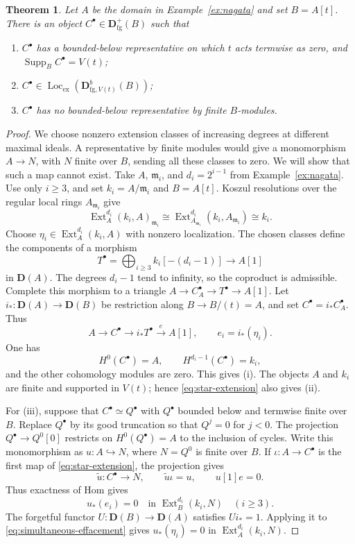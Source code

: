 \documentclass[11pt]{amsart}
\numberwithin{equation}{section}
\newtheorem{theorem}{Theorem}[section]
\theoremstyle{definition}
\theoremstyle{remark}
\DeclareMathOperator{\Supp}{Supp}
\DeclareMathOperator{\Loc}{Loc}
\DeclareMathOperator{\Ext}{Ext}
\newcommand{\D}{\mathbf D}
\newcommand{\fg}{\mathrm{fg}}
\newcommand{\Lex}{\Loc_{\mathrm{ex}}}
\newcommand{\m}{\mathfrak m}
\begin{document}
\begin{theorem}
\label{thm:no-finite-model}
Let $A$ be the domain in Example~\ref{ex:nagata} and set $B=A[t]$.
There is an object $C^{\bullet}\in\D^+_{\fg}(B)$ such that
\begin{enumerate}[label=(\roman*),leftmargin=*]
\item $C^{\bullet}$ has a bounded-below representative on which $t$ acts termwise
as zero, and $\Supp_BC^{\bullet}=V(t)$;
\item $C^{\bullet}\in\Lex(\D^b_{\fg,V(t)}(B))$;
\item $C^{\bullet}$ has no bounded-below representative by finite $B$-modules.
\end{enumerate}
\end{theorem}
\begin{proof}
We choose nonzero extension classes of increasing degrees at different
maximal ideals. A representative by finite modules would give a monomorphism
$A\to N$, with $N$ finite over $B$, sending all these classes to zero.
We will show that such a map cannot exist.
Take $A$, $\m_i$, and $d_i=2^{i-1}$ from Example~\ref{ex:nagata}.
Use only $i\geq3$, and set $k_i=A/\m_i$ and $B=A[t]$.
Koszul resolutions over the regular local rings $A_{\m_i}$ give
\[
 \Ext_A^{d_i}(k_i,A)_{\m_i}
 \cong\Ext_{A_{\m_i}}^{d_i}(k_i,A_{\m_i})\cong k_i.
\]
Choose $\eta_i\in\Ext_A^{d_i}(k_i,A)$ with nonzero localization.
The chosen classes define the components of a morphism
\[
 T^{\bullet}=\bigoplus_{i\geq3}k_i[-(d_i-1)]\longrightarrow A[1]
\]
in $\D(A)$. The degrees $d_i-1$ tend to infinity, so the coproduct is admissible.
Complete this morphism to a triangle
$A\to C_A^{\bullet}\to T^{\bullet}\to A[1]$.
Let $i_*:\D(A)\to\D(B)$ be restriction along $B\to B/(t)=A$, and set
$C^{\bullet}=i_*C_A^{\bullet}$. Thus
\begin{equation}\label{eq:star-extension}
 A\longrightarrow C^{\bullet}\longrightarrow i_*T^{\bullet}\xrightarrow{e}A[1],
 \qquad e_i=i_*(\eta_i).
\end{equation}
One has
\[
 H^0(C^{\bullet})=A,\qquad H^{d_i-1}(C^{\bullet})=k_i,
\]
and the other cohomology modules are zero. This gives (i).
The objects $A$ and $k_i$ are finite and supported in $V(t)$;
hence \eqref{eq:star-extension} also gives (ii).

For (iii), suppose that $C^{\bullet}\simeq Q^{\bullet}$ with
$Q^{\bullet}$ bounded below and termwise finite over $B$.
Replace $Q^{\bullet}$ by its good truncation so that $Q^j=0$
for $j<0$. The projection $Q^{\bullet}\to Q^0[0]$ restricts on
$H^0(Q^{\bullet})=A$ to the inclusion of cycles. Write this
monomorphism as $u:A\hookrightarrow N$, where $N=Q^0$ is finite
over $B$. If $\iota:A\to C^\bullet$ is the first map of
\eqref{eq:star-extension}, the projection gives
\[
 \widetilde u:C^\bullet\longrightarrow N,\qquad
 \widetilde u\iota=u,\qquad u[1]e=0.
\]
Thus exactness of Hom gives
\begin{equation}\label{eq:simultaneous-effacement}
 u_*(e_i)=0\quad\text{in }\Ext_B^{d_i}(k_i,N)\quad(i\geq3).
\end{equation}
The forgetful functor $U:\D(B)\to\D(A)$ satisfies $Ui_*=1$.
Applying it to \eqref{eq:simultaneous-effacement} gives
$u_*(\eta_i)=0$ in $\Ext_A^{d_i}(k_i,N)$.


\end{proof}
\end{document}
